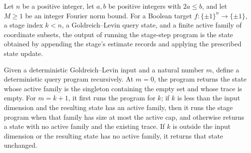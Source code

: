 \begin{theorem}
\label{FABL.DeterministicQueryProgram.runWithCost_deterministicGoldreichLevinStageStepProgram_fst}
\leanok
{}
Let $n$ be a positive integer, let $a,b$ be positive integers with $2a\le b$, and let
$M\ge1$ be an integer Fourier norm bound. For a Boolean target
$f:\{\pm1\}^n\to\{\pm1\}$, a stage index $k<n$, a Goldreich–Levin query state, and a
finite active family of coordinate subsets, the output of running the stage-step program
is the state obtained by appending the stage’s estimate records and applying the
prescribed state update.
\end{theorem}

\begin{definition}
\label{FABL.deterministicGoldreichLevinRunUpToProgram}
\leanok
{}
Given a deterministic Goldreich–Levin input and a natural number $m$, define a
deterministic query program recursively. At $m=0$, the program returns the state whose
active family is the singleton containing the empty set and whose trace is empty. For
$m=k+1$, it first runs the program for $k$; if $k$ is less than the input dimension and
the resulting state has an active family, then it runs the stage program when that
family has size at most the active cap, and otherwise returns a state with no active
family and the existing trace. If $k$ is outside the input dimension or the resulting
state has no active family, it returns that state unchanged.
\end{definition}

